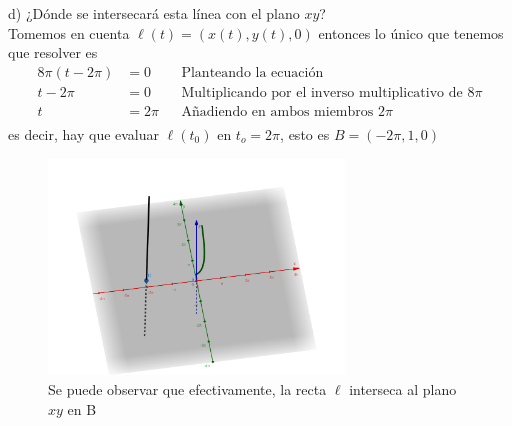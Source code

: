 \documentclass[letterpaper]{article}
\renewcommand{\l}{\ell}
\renewcommand{\*}{\cdot}
\theoremstyle{definition}
\begin{document}
\newpage
\noindent d) ¿Dónde se intersecará esta línea con el plano $xy$?\\


Tomemos en cuenta $ \l(t) = (x(t), y(t), 0) $ entonces lo único que tenemos que resolver es 
\begin{align*}
	8\pi(t -2\pi) &= 0 && \text{Planteando la ecuación}\\
	t -2\pi &= 0 && \text{Multiplicando por el inverso multiplicativo de } 8\pi \\
	t &= 2\pi && \text{Añadiendo en ambos miembros } 2\pi \\
\end{align*}
es decir, hay que evaluar $ \l(t_0) $ en $ t_o = 2\pi $, esto es $ B = (-2\pi,1,0) $
\begin{figure}[h!]
	\centering
	\includegraphics[width=0.7\textwidth]{img/Proyecto4_4.png}
	\caption{Se puede observar que efectivamente, la recta $ \l $ interseca al plano $ xy $ en B}
\end{figure}
\end{document}
